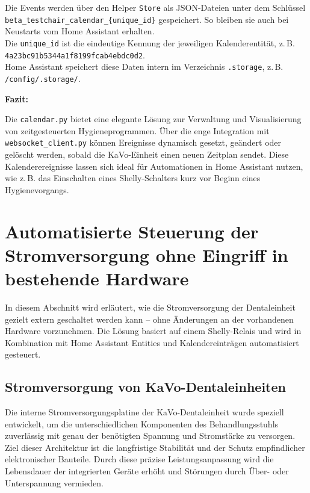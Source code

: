 Die Events werden über den Helper \texttt{Store} als JSON-Dateien unter dem Schlüssel\\
\texttt{beta\_testchair\_calendar\_\{unique\_id\}} gespeichert. So bleiben sie auch bei Neustarts vom Home Assistant erhalten.\\
Die \texttt{unique\_id} ist die eindeutige Kennung der jeweiligen Kalenderentität, z.\,B.\\
\texttt{4a23bc91b5344a1f8199fcab4ebdc0d2}.\\

Home Assistant speichert diese Daten intern im Verzeichnis \texttt{.storage}, z.\,B. \texttt{/config/.storage/}.\\

\vspace{0.5cm}

\textbf{Fazit:}

Die \texttt{calendar.py} bietet eine elegante Lösung zur Verwaltung und Visualisierung von zeitgesteuerten Hygieneprogrammen. Über die enge Integration mit \texttt{websocket\_client.py} können Ereignisse dynamisch gesetzt, geändert oder gelöscht werden, sobald die KaVo-Einheit einen neuen Zeitplan sendet. Diese Kalenderereignisse lassen sich ideal für Automationen in Home Assistant nutzen, wie z.\,B. das Einschalten eines Shelly-Schalters kurz vor Beginn eines Hygienevorgangs.


\section{Automatisierte Steuerung der Stromversorgung ohne Eingriff in bestehende Hardware}
\label{sec:stromsteuerung}

In diesem Abschnitt wird erläutert, wie die Stromversorgung der Dentaleinheit gezielt extern geschaltet werden kann – ohne Änderungen an der vorhandenen Hardware vorzunehmen. Die Lösung basiert auf einem Shelly-Relais und wird in Kombination mit Home Assistant Entities und Kalendereinträgen automatisiert gesteuert.

\subsection{Stromversorgung von KaVo-Dentaleinheiten}

Die interne Stromversorgungsplatine der KaVo-Dentaleinheit wurde speziell entwickelt, um die unterschiedlichen Komponenten des Behandlungsstuhls zuverlässig mit genau der benötigten Spannung und Stromstärke zu versorgen. Ziel dieser Architektur ist die langfristige Stabilität und der Schutz empfindlicher elektronischer Bauteile. Durch diese präzise Leistungsanpassung wird die Lebensdauer der integrierten Geräte erhöht und Störungen durch Über- oder Unterspannung vermieden.

